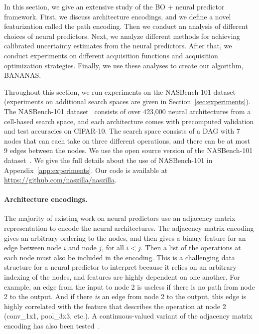 \documentclass[11pt]{article}
\numberwithin{equation}{section}
\numberwithin{figure}{section}
\theoremstyle{plain}
\theoremstyle{definition}
\let\citep\cite
\begin{document}
In this section, we give an extensive study of the BO + neural predictor
framework. First, we discuss architecture encodings, and we define a novel
featurization called the path encoding.
Then we conduct an analysis of different choices of neural predictors.
Next, we analyze different methods for achieving calibrated uncertainty
estimates from the neural predictors.
After that, we conduct experiments on different acquisition functions
and acquisition optimization strategies.
Finally, we use these analyses to create our algorithm, BANANAS.

Throughout this section, we run experiments on the NASBench-101 dataset
(experiments on additional search spaces are given in Section~\ref{sec:experiments}).
The NASBench-101 dataset~\citep{nasbench} consists of over 423,000 
neural architectures from a cell-based search space,
and each architecture comes with precomputed validation 
and test accuracies on CIFAR-10. 
The search space consists of a DAG with 7 nodes
that can each take on three different operations, and there can
be at most 9 edges between the nodes. 
We use the open source version of the NASBench-101 dataset~\cite{nasbench}.
We give the full details about the use of NASBench-101 in
Appendix~\ref{app:experiments}. Our code is available at
\url{https://github.com/naszilla/naszilla}.





\paragraph{Architecture encodings.}
The majority of existing work on neural predictors use an adjacency
matrix representation to encode the neural architectures.
The adjacency matrix encoding gives an arbitrary ordering to the nodes, 
and then gives a binary feature for an edge between node $i$ and node $j$, 
for all $i<j$. 
Then a list of the operations at each node must also be included in the encoding.
This is a challenging data structure for a neural predictor to interpret 
because it relies on an arbitrary indexing of the nodes, and features are 
highly dependent on one another. For example, an edge from the input to node 2 
is useless if there is no path from node 2 to the output.
And if there \emph{is} an edge from node 2 to the output, this edge is highly
correlated with the feature that describes the operation at node 2 
(conv\_1x1, pool\_3x3, etc.).
A continuous-valued variant of the adjacency matrix encoding has also 
been tested~\cite{nasbench}.
\end{document}
